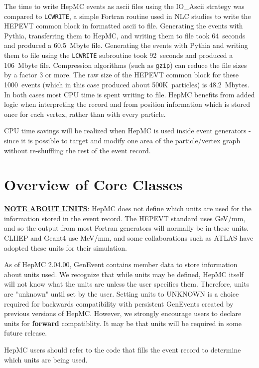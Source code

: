 \documentclass[11pt,letterpaper]{article}
\begin{document}
The time to write HepMC events as ascii files using the IO\_Ascii
strategy was compared to \verb!LCWRITE!, a simple Fortran routine used
in NLC studies to write the HEPEVT common block in formatted ascii to file.
Generating the events with Pythia, transferring them to HepMC, and
writing them to file took 64~seconds and produced a 60.5~Mbyte file.
Generating the events with Pythia and writing them to file using the
\verb!LCWRITE! subroutine took 92~seconds and produced a 106~Mbyte
file. Compression algorithms (such as \verb!gzip!) can reduce the file
sizes by a factor 3 or more.  The raw size of the HEPEVT common block
for these 1000~events (which in this case produced about 500K~particles) is
48.2~Mbytes.  In both cases most CPU time is spent writing to file.
HepMC benefits from added logic when interpreting the record and from 
position information which is stored once for each vertex, rather than
with every particle.  

CPU time savings will be realized when HepMC is
used inside event generators - since it is possible to target and
modify one area of the particle/vertex graph without re-shuffling the
rest of the event record.

%
%
\section{Overview of Core Classes}

\underline{\bf NOTE ABOUT UNITS}:
HepMC does not define which units are used for the information stored
in the event record.
The HEPEVT standard uses GeV/mm, and so the output from most Fortran
generators will normally be in these units.
CLHEP and Geant4 use MeV/mm, and some collaborations such as ATLAS
have adopted these units for their simulation.

As of HepMC 2.04.00, GenEvent contains member data to store information
about units used.  We recognize that while units may be defined, 
HepMC itself will not know what the units are unless the user specifies them.
Therefore, units are "unknown" until set by the user.
Setting units to UNKNOWN is a choice required for backwards compatibility
with persistent GenEvents created by previous versions of HepMC.
However, we strongly encourage users to declare units 
for {\bf forward} compatiblity.  
It may be that units will be required in some future release.

HepMC users should refer to the code that fills the event record 
to determine which units are being used.
\end{document}
